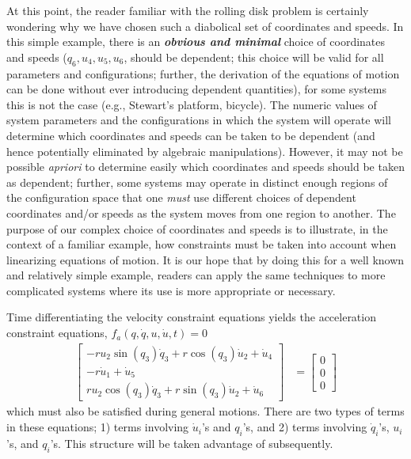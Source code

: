 At this point, the reader familiar with the rolling disk problem is certainly
wondering why we have chosen such a diabolical set of coordinates and speeds.
In this simple example, there is an {\bf \textit{obvious and minimal}} choice of
coordinates and speeds ($q_6, u_4, u_5, u_6$, should be dependent; this choice
will be valid for all parameters and configurations; further, the derivation of
the equations of motion can be done without ever introducing dependent quantities),
for some systems this is not the case (e.g., Stewart's platform, bicycle). The
numeric values of system parameters and the configurations in which the system
will operate will determine which coordinates and speeds can be taken to be
dependent (and hence potentially eliminated by algebraic manipulations).
However, it may not be possible \textit{apriori} to determine easily which
coordinates and speeds should be taken as dependent; further, some systems may
operate in distinct enough regions of the configuration space that one
\textit{must} use different choices of dependent coordinates and/or speeds as
the system moves from one region to another. The purpose of our complex
choice of coordinates and speeds is to illustrate, in the context of a familiar
example, how constraints must be taken into account when linearizing equations
of motion. It is our hope that by doing this for a well known and relatively
simple example, readers can apply the same techniques to more complicated
systems where its use is more appropriate or necessary.

Time differentiating the velocity constraint equations yields the acceleration
constraint equations, $f_a(q, \dot{q}, u, \dot{u}, t) = 0$
\begin{subequations}
\label{rd:f_a}
\begin{align}
  \begin{bmatrix}
    -r u_{2} \sin(q_{3}) \dot{q}_{3} + r \cos(q_{3}) \dot{u}_{2} + \dot{u}_{4}
    \\
    - r \dot{u}_{1} + \dot{u}_{5} \\
    r u_{2} \cos(q_{3}) \dot{q}_{3} + r \sin(q_{3}) \dot{u}_{2} + \dot{u}_{6}
  \end{bmatrix}
  &=
  \begin{bmatrix} 0 \\ 0 \\ 0 \end{bmatrix}
\end{align}
\end{subequations}
which must also be satisfied during general motions. There are two types of
terms in these equations; 1) terms involving $\dot{u}_i$'s and $q_i$'s, and 2)
terms involving $\dot{q}_i$'s, $u_i$'s, and $q_i$'s. This structure will be
taken advantage of subsequently.

